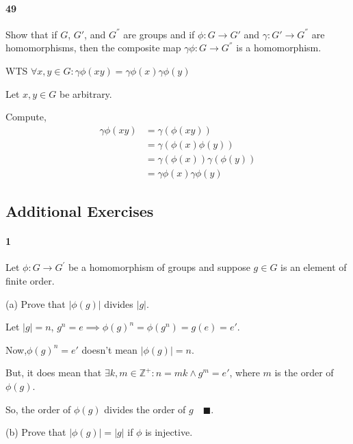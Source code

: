\documentclass{article}
\newcommand\Z{\mathbb{Z}}
\begin{document}
\paragraph{49} Show that if $G$, $G'$, and $G^{''}$ are groups and if
$\phi: G\rightarrow G'$ and $\gamma:G'\rightarrow G^{''}$ are
homomorphisms, then the composite map $\gamma\phi:G \rightarrow
G^{''}$ is a homomorphism.


WTS $\forall x,y \in G: \gamma\phi(xy) = \gamma\phi(x)\gamma\phi(y)$

Let $x,y \in G$ be arbitrary.

Compute,
\begin{align*}
  \gamma\phi(xy) &= \gamma(\phi(xy))\\
                 &= \gamma(\phi(x)\phi(y)) \\
                 &= \gamma(\phi(x))\gamma(\phi(y))\\
                 &= \gamma\phi(x)\gamma\phi(y)
\end{align*}

\subsection*{Additional Exercises}

\paragraph{1} Let $\phi: G\rightarrow G^\prime$ be a homomorphism of
groups and suppose $g\in G$ is an element of finite order.

(a) Prove that $|\phi(g)|$ divides $|g|$.


Let $|g| = n$, $g^n = e\implies \phi(g)^n = \phi(g^n) = g(e) = e'$.

Now,$\phi(g)^n = e'$ doesn't mean $|\phi(g)| = n$.

But, it does mean that $\exists k,m\in\Z^+: n = mk \land g^m = e'$, where $m$ is the
order of $\phi(g)$.

So, the order of $\phi(g)$ divides the
order of $g\quad \blacksquare$.

(b) Prove that $|\phi(g)| = |g|$ if $\phi$ is injective.

\end{document}
